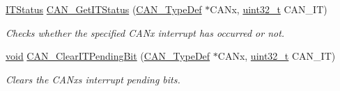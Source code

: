 \begin{DoxyCompactItemize}
\hyperlink{agilefox_2library_2inc_2stm32f10x__type_8h_aacbd7ed539db0aacd973a0f6eca34074}{I\+T\+Status} \hyperlink{group___c_a_n___exported___functions_ga9aca05b3013e1b3438f3559f80b33c82}{C\+A\+N\+\_\+\+Get\+I\+T\+Status} (\hyperlink{struct_c_a_n___type_def}{C\+A\+N\+\_\+\+Type\+Def} $\ast$C\+A\+Nx, \hyperlink{_p_e___types_8h_a33594304e786b158f3fb30289278f5af}{uint32\+\_\+t} C\+A\+N\+\_\+\+IT)
\begin{DoxyCompactList}\small\item\em Checks whether the specified C\+A\+Nx interrupt has occurred or not. \end{DoxyCompactList}\item 
\hyperlink{usb__devapi_8h_afabf60e7f57651d6d595a02c75f07cd0}{void} \hyperlink{group___c_a_n___exported___functions_ga30bf7ac0c1793f6622a4a1adbb7dbc8a}{C\+A\+N\+\_\+\+Clear\+I\+T\+Pending\+Bit} (\hyperlink{struct_c_a_n___type_def}{C\+A\+N\+\_\+\+Type\+Def} $\ast$C\+A\+Nx, \hyperlink{_p_e___types_8h_a33594304e786b158f3fb30289278f5af}{uint32\+\_\+t} C\+A\+N\+\_\+\+IT)
\begin{DoxyCompactList}\small\item\em Clears the C\+A\+Nx\textquotesingle{}s interrupt pending bits. \end{DoxyCompactList}\end{DoxyCompactItemize}
